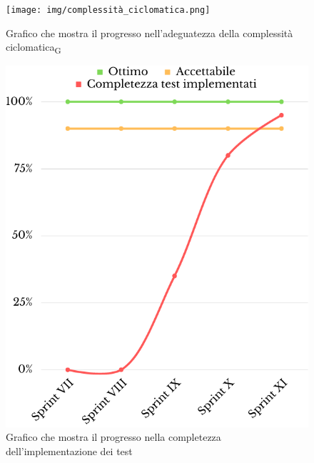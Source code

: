\begin{figure}[H]
	\centering
	\texttt{[image: img/complessità\_ciclomatica.png]}
	\caption{Grafico che mostra il progresso nell'adeguatezza della complessità ciclomatica\textsubscript{G}}
\end{figure}
\begin{figure}[H]
	\centering
	\includegraphics[scale=0.35]{img/completezza_test.png}
	\caption{Grafico che mostra il progresso nella completezza dell'implementazione dei test}
\end{figure}
